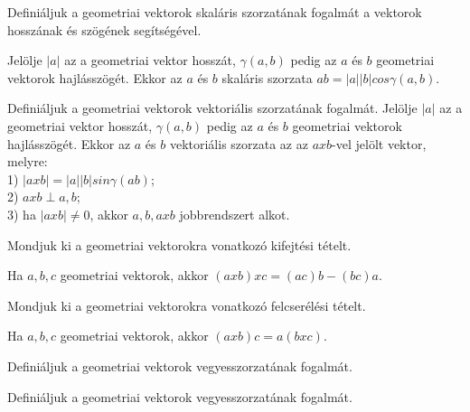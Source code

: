 \begin{frame}
  \begin{tcolorbox}[title={18}]
   Definiáljuk a geometriai vektorok skaláris szorzatának fogalmát a vektorok hosszának és szögének segítségével.

  \tcblower
Jelölje $|a|$ az a geometriai vektor hosszát, ${\gamma}(a,b)$ pedig az $a$ és $b$ geometriai vektorok hajlásszögét. Ekkor az $a$ és $b$ skaláris szorzata $ab = |a||b|cos{\gamma}(a,b)$.

  \end{tcolorbox}
\end{frame}


\begin{frame}
  \begin{tcolorbox}[title={19}]
   Definiáljuk a geometriai vektorok vektoriális szorzatának fogalmát.
  \tcblower
Jelölje $|a|$ az a geometriai vektor hosszát, ${\gamma}(a,b)$ pedig az $a$ és $b$ geometriai vektorok hajlásszögét. Ekkor az $a$ és $b$ vektoriális szorzata az az $a x b$-vel jelölt vektor, melyre:\\

1) $|a x b| = |a||b|sin{\gamma}(ab)$;\\
2) $a x b {\perp} a,b$;\\
3) ha $|a x b| \neq 0$, akkor $a,b,a x b$ jobbrendszert alkot.

  \end{tcolorbox}
\end{frame}


\begin{frame}
  \begin{tcolorbox}[title={20}]
    Mondjuk ki a geometriai vektorokra vonatkozó kifejtési tételt.

  \tcblower
Ha $a,b,c$ geometriai vektorok, akkor $(a x b) x c = (ac)b - (bc)a$.

  \end{tcolorbox}
\end{frame}


\begin{frame}
  \begin{tcolorbox}[title={21}]
    Mondjuk ki a geometriai vektorokra vonatkozó felcserélési tételt.

  \tcblower
    Ha $a,b,c$ geometriai vektorok, akkor $(a x b)c = a(b x c)$. 
  \end{tcolorbox}
\end{frame}


\begin{frame}
  \begin{tcolorbox}[title={22}]
    Definiáljuk a geometriai vektorok vegyesszorzatának fogalmát.

  \tcblower
 Definiáljuk a geometriai vektorok vegyesszorzatának fogalmát.

  \end{tcolorbox}
\end{frame}


